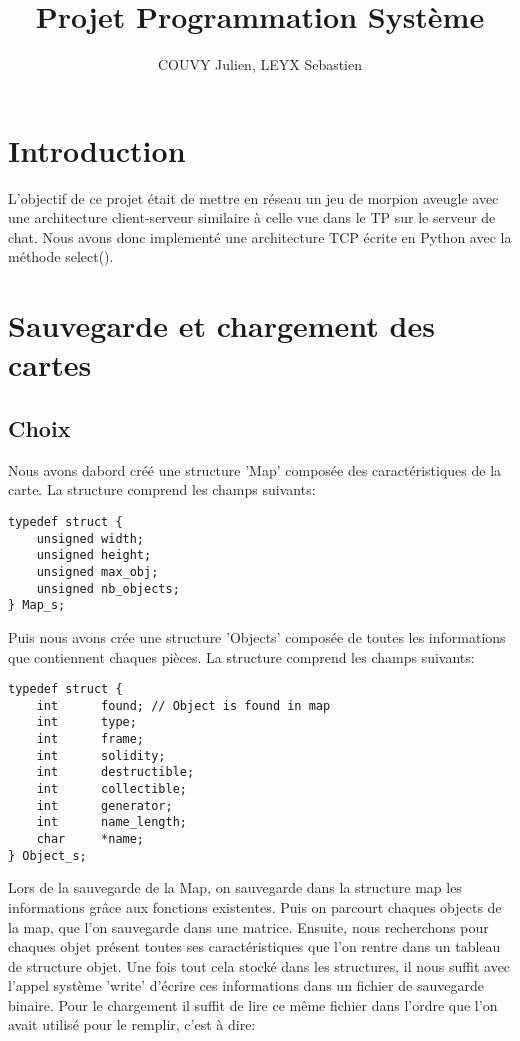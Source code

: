 \documentclass[a4paper]{article}
\title{Projet Programmation Système}
\author{COUVY Julien, LEYX Sebastien}
\begin{document}
\maketitle

\section{Introduction}
L'objectif de ce projet était de mettre en réseau un jeu de morpion aveugle avec une architecture client-serveur similaire à celle vue dans le TP sur le serveur de chat. Nous avons donc implementé une architecture TCP écrite en Python avec la méthode select().

\section{Sauvegarde et chargement des cartes}
\subsection{Choix}
Nous avons dabord créé une structure 'Map' composée des caractéristiques de la carte. La structure comprend les champs suivants:

\begin{verbatim}
typedef struct {
    unsigned width;
    unsigned height;
    unsigned max_obj;
    unsigned nb_objects;
} Map_s;
\end{verbatim}

Puis nous avons crée une structure 'Objects' composée de toutes les informations que contiennent chaques pièces. La structure comprend les champs suivants:
\begin{verbatim}
typedef struct {
    int      found; // Object is found in map
    int      type;
    int      frame;
    int      solidity;
    int      destructible;
    int      collectible;
    int      generator;
    int      name_length;
    char     *name;
} Object_s;
\end{verbatim}

Lors de la sauvegarde de la Map, on sauvegarde dans la structure map les informations grâce aux fonctions existentes. Puis on parcourt chaques objects de la map, que l'on sauvegarde dans une matrice. Ensuite, nous recherchons pour chaques objet présent toutes ses caractéristiques que l'on rentre dans un tableau de structure objet. Une fois tout cela stocké dans les structures, il nous suffit avec l'appel système 'write' d'écrire ces informations dans un fichier de sauvegarde binaire. Pour le chargement il suffit de lire ce même fichier dans l'ordre que l'on avait utilisé pour le remplir, c'est à dire:
\end{document}
